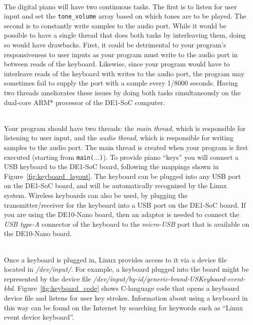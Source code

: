 \documentclass[epsfig,10pt,fullpage]{article}
\begin{document}
~\\
\noindent
The digital piano will have two continuous tasks. The first is to listen for user input 
and set the \texttt{tone\_volume} array based on which tones are to be played. The second is
to constantly write samples to the audio port. While it would be possible to
have a single thread that does both
tasks by interleaving them, doing so would have drawbacks. First, it could be detrimental to
your program's responsiveness to user inputs as your program must write to the audio port in
between reads of the keyboard. Likewise, since your program would have to interleave reads
of the keyboard with writes to the audio port, the program may sometimes fail 
to supply the port with a
sample every 1/8000 seconds. Having two threads ameliorates these issues by doing both tasks
simultaneously on the dual-core ARM* processor of the DE1-SoC computer.

~\\
\noindent 
Your program should have two threads: the {\it main thread}, which is responsible 
for listening to user input, and the {\it audio thread}, which is responsible for writing 
samples to the audio port.
The main thread is created when your program is first executed (starting from
\texttt{main($\ldots$)}).
To provide piano ``keys'' you will connect a USB keyboard to the DE1-SoC board, following the
mappings shown in Figure~\ref{fig:keyboard_layout}. The keyboard can be plugged into any
USB port on the DE1-SoC board, and will be automatically recognized by the Linux system.
Wireless keyboards can also be used, by plugging the transmitter/receiver for the keyboard
into a USB port on the DE1-SoC board. If you are using the DE10-Nano board, then
an adaptor is needed to connect the {\it USB type-A} connector of the keyboard to the 
{\it micro-USB} port that is available on the DE10-Nano board.

~\\
\noindent
Once a keyboard is plugged in, Linux provides access to it via a device file located in
\textit{/dev/input/}. For example, a keyboard plugged into the board might be represented by
the device file \textit{/dev/input/by-id/generic-brand-USKeyboard-event-kbd}. 
Figure~\ref{fig:keyboard_code} shows C-language code that opens a keyboard device file and
listens for user key strokes. Information about using a keyboard in this way can be found
on the Internet by searching for keywords such as ``Linux event device keyboard''.
\end{document}
